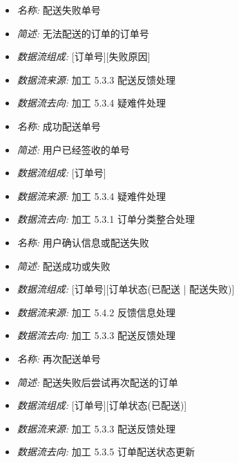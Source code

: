 \documentclass{article}
\begin{document}
\begin{CJK*}{UTF8}{gbsn}
\begin{itemize}
\end{itemize}


\vspace{-1mm}


\begin{itemize}
\item \textit{名称: }配送失败单号 
\item \textit{简述: }无法配送的订单的订单号 
\item \textit{数据流组成: }[订单号][失败原因] 
\item \textit{数据流来源: }加工 5.3.3 配送反馈处理 
\item \textit{数据流去向: }加工 5.3.4 疑难件处理

\end{itemize}


\vspace{-1mm}


\begin{itemize}
\item \textit{名称: }成功配送单号
\item \textit{简述: }用户已经签收的单号
\item \textit{数据流组成: }[订单号]
\item \textit{数据流来源: }加工 5.3.4 疑难件处理 
\item \textit{数据流去向: }加工 5.3.1 订单分类整合处理

\end{itemize}


\vspace{-1mm}


\begin{itemize}
\item \textit{名称: }用户确认信息或配送失败
\item \textit{简述: }配送成功或失败 
\item \textit{数据流组成: }[订单号][订单状态(已配送 | 配送失败)] 
\item \textit{数据流来源: }加工 5.4.2 反馈信息处理 
\item \textit{数据流去向: }加工 5.3.3 配送反馈处理

\end{itemize}


\vspace{-1mm}


\begin{itemize}
\item \textit{名称: }再次配送单号 
\item \textit{简述: }配送失败后尝试再次配送的订单 
\item \textit{数据流组成: }[订单号][订单状态(已配送)] 
\item \textit{数据流来源: }加工 5.3.3 配送反馈处理 
\item \textit{数据流去向: }加工 5.3.5 订单配送状态更新


\end{itemize}
\end{CJK*}
\end{document}
